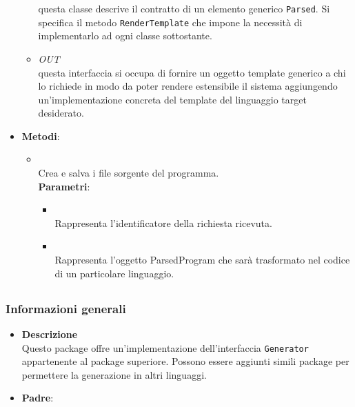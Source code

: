\begin{itemize}
\begin{itemize}
questa classe descrive il contratto di un elemento generico \texttt{Parsed}. Si specifica il metodo \texttt{RenderTemplate} che impone la necessità di implementarlo ad ogni classe sottostante.
\item \textit{OUT} \hyperref[\nogloxy{swedesigner::server::template::Template}]{}\\
questa interfaccia si occupa di fornire un oggetto template generico a chi lo richiede in modo da poter rendere estensibile il sistema aggiungendo un'implementazione concreta del template del linguaggio target desiderato.
\end{itemize}
\item \textbf{Metodi}:
\begin{itemize}
\item {}
\\ Crea e salva i file sorgente del programma.
\\ \textbf{Parametri}:
\begin{itemize}
\item {}
\\ Rappresenta l'identificatore della richiesta ricevuta.
\item {}
\\ Rappresenta l'oggetto ParsedProgram che sarà trasformato nel codice di un particolare linguaggio. 
\end{itemize}
\end{itemize}
\end{itemize}
\subsection{}
\label{\nogloxy{swedesigner::server::generator::java}}
\subsubsection{Informazioni generali}
\begin{itemize}
\item \textbf{Descrizione}\\
Questo package offre un'implementazione dell'interfaccia \texttt{Generator} appartenente al package superiore. Possono essere aggiunti simili package per permettere la generazione in altri linguaggi.
\item \textbf{Padre}: \hyperref[\nogloxy{swedesigner::server::generator}]{}
\end{itemize}

